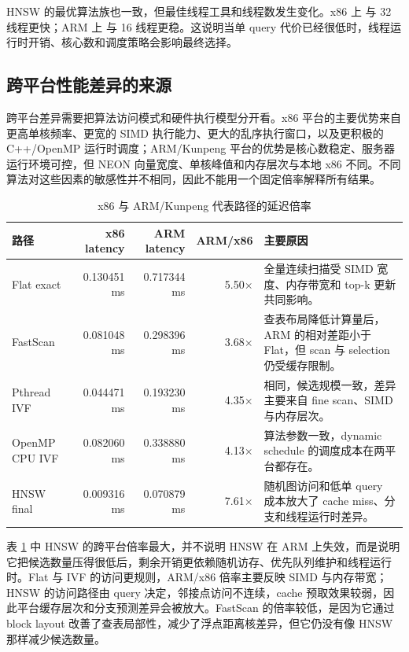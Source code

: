 \documentclass[11pt,a4paper]{article}
\newcommand{\code}[1]{\texttt{\detokenize{#1}}}
\begin{document}
HNSW 的最优算法族也一致，但最佳线程工具和线程数发生变化。x86 上 \code{std::async} 与 32 线程更快；ARM 上 \code{std::thread} 与 16 线程更稳。这说明当单 query 代价已经很低时，线程运行时开销、核心数和调度策略会影响最终选择。

\subsection{跨平台性能差异的来源}

跨平台差异需要把算法访问模式和硬件执行模型分开看。x86 平台的主要优势来自更高单核频率、更宽的 SIMD 执行能力、更大的乱序执行窗口，以及更积极的 C++/OpenMP 运行时调度；ARM/Kunpeng 平台的优势是核心数稳定、服务器运行环境可控，但 NEON 向量宽度、单核峰值和内存层次与本地 x86 不同。不同算法对这些因素的敏感性并不相同，因此不能用一个固定倍率解释所有结果。

\begin{table}[H]\centering\scriptsize
\caption{x86 与 ARM/Kunpeng 代表路径的延迟倍率}
\label{tab:cross_ratio}
\begin{tabularx}{\textwidth}{>{\raggedright\arraybackslash}p{}rrr>{\raggedright\arraybackslash}X}
\toprule
路径 & x86 latency & ARM latency & ARM/x86 & 主要原因 \\
\midrule
Flat exact & 0.130451 ms & 0.717344 ms & 5.50$\times$ & 全量连续扫描受 SIMD 宽度、内存带宽和 top-k 更新共同影响。 \\
FastScan & 0.081048 ms & 0.298396 ms & 3.68$\times$ & 查表布局降低计算量后，ARM 的相对差距小于 Flat，但 scan 与 selection 仍受缓存限制。 \\
Pthread IVF & 0.044471 ms & 0.193230 ms & 4.35$\times$ & \code{nlist/nprobe} 相同，候选规模一致，差异主要来自 fine scan、SIMD 与内存层次。 \\
OpenMP CPU IVF & 0.082060 ms & 0.338880 ms & 4.13$\times$ & 算法参数一致，dynamic schedule 的调度成本在两平台都存在。 \\
HNSW final & 0.009316 ms & 0.070879 ms & 7.61$\times$ & 随机图访问和低单 query 成本放大了 cache miss、分支和线程运行时差异。 \\
\bottomrule
\end{tabularx}
\end{table}

表 \ref{tab:cross_ratio} 中 HNSW 的跨平台倍率最大，并不说明 HNSW 在 ARM 上失效，而是说明它把候选数量压得很低后，剩余开销更依赖随机访存、优先队列维护和线程运行时。Flat 与 IVF 的访问更规则，ARM/x86 倍率主要反映 SIMD 与内存带宽；HNSW 的访问路径由 query 决定，邻接点访问不连续，cache 预取效果较弱，因此平台缓存层次和分支预测差异会被放大。FastScan 的倍率较低，是因为它通过 block layout 改善了查表局部性，减少了浮点距离核差异，但它仍没有像 HNSW 那样减少候选数量。
\end{document}
